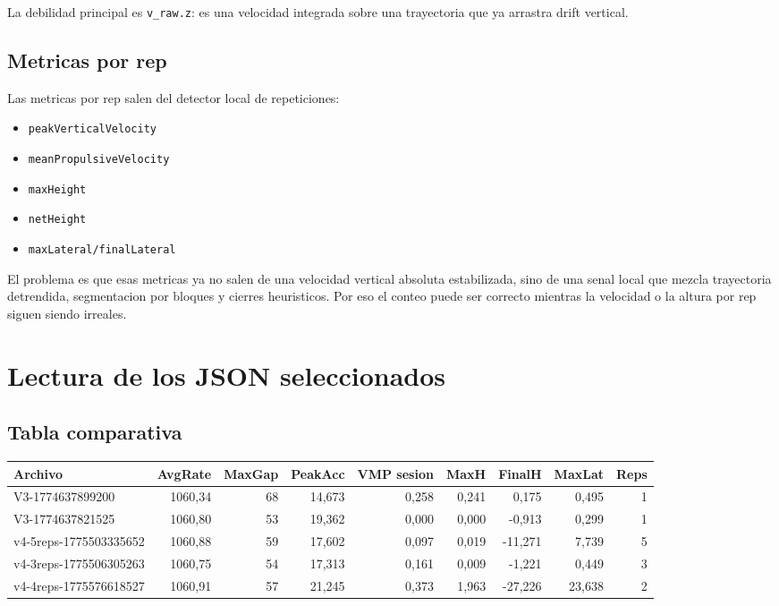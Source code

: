 \documentclass[11pt,a4paper]{article}
\begin{document}
La debilidad principal es \texttt{v\_raw.z}: es una velocidad integrada sobre una trayectoria que ya arrastra drift vertical.

\subsection*{Metricas por rep}
Las metricas por rep salen del detector local de repeticiones:
\begin{itemize}[leftmargin=14pt]
  \item \texttt{peakVerticalVelocity}
  \item \texttt{meanPropulsiveVelocity}
  \item \texttt{maxHeight}
  \item \texttt{netHeight}
  \item \texttt{maxLateral/finalLateral}
\end{itemize}

El problema es que esas metricas ya no salen de una velocidad vertical absoluta estabilizada, sino de una senal local que mezcla trayectoria detrendida, segmentacion por bloques y cierres heuristicos. Por eso el conteo puede ser correcto mientras la velocidad o la altura por rep siguen siendo irreales.

\section{Lectura de los JSON seleccionados}
\subsection*{Tabla comparativa}
\footnotesize
\begin{longtable}{p{4.1cm}rrrrrrrr}
\toprule
Archivo & AvgRate & MaxGap & PeakAcc & VMP sesion & MaxH & FinalH & MaxLat & Reps \\
\midrule
\endhead
V3-1774637899200 & 1060,34 & 68 & 14,673 & 0,258 & 0,241 & 0,175 & 0,495 & 1 \\
V3-1774637821525 & 1060,80 & 53 & 19,362 & 0,000 & 0,000 & -0,913 & 0,299 & 1 \\
v4-5reps-1775503335652 & 1060,88 & 59 & 17,602 & 0,097 & 0,019 & -11,271 & 7,739 & 5 \\
v4-3reps-1775506305263 & 1060,75 & 54 & 17,313 & 0,161 & 0,009 & -1,221 & 0,449 & 3 \\
v4-4reps-1775576618527 & 1060,91 & 57 & 21,245 & 0,373 & 1,963 & -27,226 & 23,638 & 2 \\
\bottomrule
\end{longtable}
\normalsize
\end{document}
